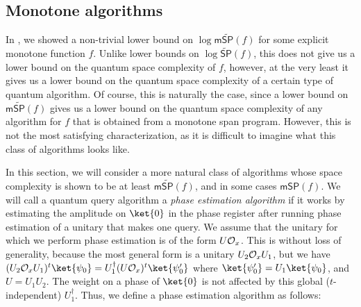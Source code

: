 \documentclass[11pt]{article}
\numberwithin{equation}{section}
\theoremstyle{definition}
\theoremstyle{plain}
\begin{document}
\subsection{Monotone algorithms}\label{sec:monotone-alg}


In , we showed a non-trivial lower bound on $\log\mathsf{m}\widetilde{\mathsf{SP}}(f)$ for some explicit monotone function $f$. Unlike lower bounds on $\log\widetilde{\mathsf{SP}}(f)$, this does not give us a lower bound on the quantum space complexity of $f$, however, at the very least it gives us a lower bound on the quantum space complexity of a certain type of quantum algorithm. Of course, this is naturally the case, since a lower bound on $\mathsf{m}\widetilde{\mathsf{SP}}(f)$ gives us a lower bound on the quantum space complexity of any algorithm for $f$ that is obtained from a monotone span program. However, this is not the most satisfying characterization, as it is difficult to imagine what this class of algorithms looks like. 

In this section, we will consider a more natural class of algorithms whose space complexity is %
shown to be at least %
$\mathsf{m}\widetilde{\mathsf{SP}}(f)$, and in some cases $\mathsf{mSP}(f)$. We will call a quantum query algorithm a \emph{phase estimation algorithm} if it works by estimating the amplitude on $\ket{0}$ in the phase register after running phase estimation of a unitary that makes one query. We assume that the unitary for which we perform phase estimation is of the form $U{\cal O}_x$. This is without loss of generality, because the most general form is a unitary $U_2{\cal O}_xU_1$, but we have $(U_2{\cal O}_x U_1)^t\ket{\psi_0}=U_1^\dagger(U{\cal O}_x)^t\ket{\psi_0'}$ where $\ket{\psi_0'}=U_1\ket{\psi_0}$, and $U=U_1U_2$. The weight on a phase of $\ket{0}$ is not affected by this global ($t$-independent) $U_1^\dagger$. Thus, we define a phase estimation algorithm as follows:
\end{document}
